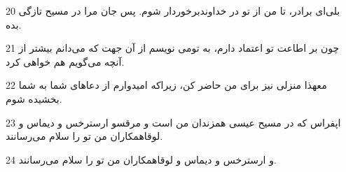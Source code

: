 \par 20 بلی‌ای برادر، تا من از تو در خداوندبرخوردار شوم. پس جان مرا در مسیح تازگی بده.
\par 21 چون بر اطاعت تو اعتماد دارم، به تومی نویسم از آن جهت که می‌دانم بیشتر از آنچه می‌گویم هم خواهی کرد.
\par 22 معهذا منزلی نیز برای من حاضر کن، زیراکه امیدوارم از دعاهای شما به شما بخشیده شوم.
\par 23 اپفراس که در مسیح عیسی همزندان من است و مرقسو ارسترخس و دیماس و لوقاهمکاران من تو را سلام می‌رسانند.
\par 24 و ارسترخس و دیماس و لوقاهمکاران من تو را سلام می‌رسانند.


